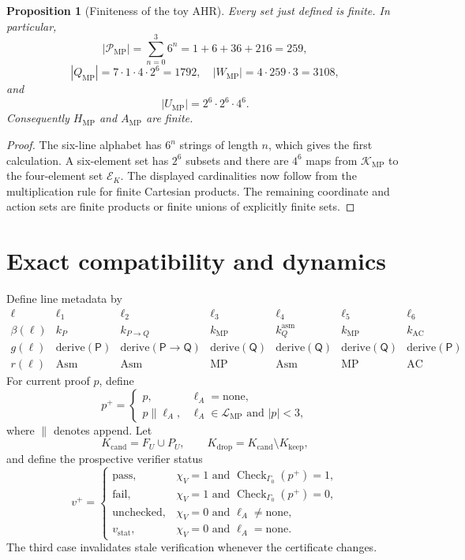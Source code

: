 \documentclass[11pt,oneside]{book}
\newtheorem{proposition}[definition]{Proposition}
\theoremstyle{remark}
\DeclareMathOperator{\ProofCheck}{Check}
\begin{document}
\begin{proposition}[Finiteness of the toy AHR]
Every set just defined is finite. In particular,
\[
|\mathcal P_{\mathrm{MP}}|
=\sum_{n=0}^3 6^n=1+6+36+216=259,
\]
\[
|Q_{\mathrm{MP}}|=7\cdot1\cdot4\cdot2^6=1792,
\quad
|W_{\mathrm{MP}}|=4\cdot259\cdot3=3108,
\]
and
\[
|U_{\mathrm{MP}}|=2^6\cdot2^6\cdot4^6.
\]
Consequently $H_{\mathrm{MP}}$ and $A_{\mathrm{MP}}$ are finite.
\end{proposition}

\begin{proof}
The six-line alphabet has $6^n$ strings of length $n$, which gives the first
calculation. A six-element set has $2^6$ subsets and there are $4^6$ maps
from $\mathcal K_{\mathrm{MP}}$ to the four-element set $\mathcal E_K$.
The displayed cardinalities now follow from the multiplication rule for
finite Cartesian products. The remaining coordinate and action sets are
finite products or finite unions of explicitly finite sets.
\end{proof}

\section{Exact compatibility and dynamics}

Define line metadata by
\[
\begin{array}{c|cccccc}
\ell&\ell_1&\ell_2&\ell_3&\ell_4&\ell_5&\ell_6\\
\hline
\beta(\ell)&k_P&k_{P\to Q}&k_{\mathrm{MP}}&
k_Q^{\mathrm{asm}}&k_{\mathrm{MP}}&k_{\mathrm{AC}}\\
g(\ell)&\mathrm{derive}(\mathsf P)&
\mathrm{derive}(\mathsf P\to\mathsf Q)&
\mathrm{derive}(\mathsf Q)&
\mathrm{derive}(\mathsf Q)&
\mathrm{derive}(\mathsf Q)&
\mathrm{derive}(\mathsf P)\\
r(\ell)&\mathrm{Asm}&\mathrm{Asm}&\mathrm{MP}&
\mathrm{Asm}&\mathrm{MP}&\mathrm{AC}
\end{array}
\]
For current proof $p$, define
\[
p^+=
\begin{cases}
p,&\ell_A=\mathrm{none},\\
p\mathbin{\|}\ell_A,&\ell_A\in\mathcal L_{\mathrm{MP}}
\text{ and }|p|<3,
\end{cases}
\]
where $\|$ denotes append. Let
\[
K_{\mathrm{cand}}=F_U\cup P_U,
\qquad
K_{\mathrm{drop}}=K_{\mathrm{cand}}\setminus K_{\mathrm{keep}},
\]
and define the prospective verifier status
\[
v^+=
\begin{cases}
\mathrm{pass},&\chi_V=1\text{ and }\ProofCheck_{\Gamma_0}(p^+)=1,\\
\mathrm{fail},&\chi_V=1\text{ and }\ProofCheck_{\Gamma_0}(p^+)=0,\\
\mathrm{unchecked},&\chi_V=0\text{ and }\ell_A\ne\mathrm{none},\\
v_{\mathrm{stat}},&\chi_V=0\text{ and }\ell_A=\mathrm{none}.
\end{cases}
\]
The third case invalidates stale verification whenever the certificate
changes.
\end{document}
